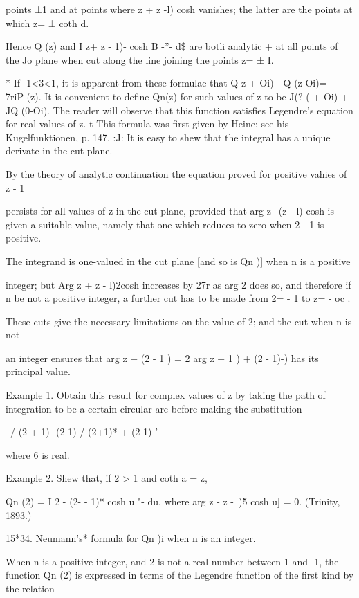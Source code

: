 {{points ±1 and at points where z + z -l) cosh vanishes; the latter are
the points at which z= ± coth d.

Hence Q (z) and I z+ z - 1)- cosh B -''- d\$ are botli analytic + at
all points of the Jo plane when cut along the line joining the points
z= ± I.

* If -1<3<1, it is apparent from these formulae that Q z + Oi) - Q
(z-Oi)= - 7riP (z). It is convenient to define Qn(z) for such values
of z to be J(? ( + Oi) + JQ (0-Oi). The reader will observe that this
function satisfies Legendre's equation for real values of z. t This
formula was first given by Heine; see his Kugelfunktionen, p. 147.
:J: It is easy to shew that the integral has a unique derivate in the
cut plane.

%
%

By the theory of analytic continuation the equation proved for
positive vahies of z - 1

persists for all values of z in the cut plane, provided that arg z+(z
- l) cosh is given a suitable value, namely that one which reduces to
zero when 2 - 1 is positive.

The integrand is one-valued in the cut plane [and so is Qn )] when n
is a positive

integer; but Arg z + z - l)2cosh increases by 27r as arg 2 does so,
and therefore if n be not a positive integer, a further cut has to be
made from 2= - 1 to z= - oc .

These cuts give the necessary limitations on the value of 2; and the
cut when n is not

an integer ensures that arg z + (2 - 1 ) = 2 arg z + 1 ) + (2 - 1)-)
has its principal value.

Example 1. Obtain this result for complex values of z by taking the
path of integration to be a certain circular arc before making the
substitution

 \ / (2 + 1) -(2-1) / (2+1)* + (2-1) '

where 6 is real.

Example 2. Shew that, if 2 > 1 and coth a = z,

Qn (2) = I 2 - (2- - 1)* cosh u "- du, where arg z - z -\ )5 cosh u] =
0. (Trinity, 1893.)

15*34. Neumann's* formula for Qn )i when n is an integer.

When n is a positive integer, and 2 is not a real number between 1 and
-1, the function Qn (2) is expressed in terms of the Legendre function
of the first kind by the relation

}}
